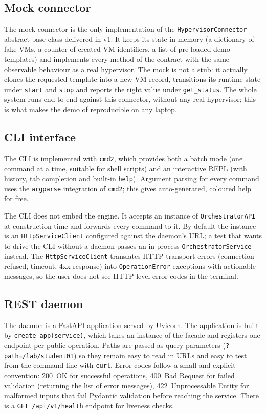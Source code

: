 \subsection{Mock connector}

The mock connector is the only implementation of the
\texttt{HypervisorConnector} abstract base class delivered in v1.
It keeps its state in memory (a dictionary of fake VMs, a counter
of created VM identifiers, a list of pre-loaded demo templates) and
implements every method of the contract with the same observable
behaviour as a real hypervisor. The mock is not a stub: it actually
clones the requested template into a new VM record, transitions
its runtime state under \texttt{start} and \texttt{stop} and reports
the right value under \texttt{get\_status}. The whole system runs
end-to-end against this connector, without any real hypervisor;
this is what makes the demo of  reproducible on any
laptop.

\subsection{CLI interface}

The CLI is implemented with \texttt{cmd2}, which provides both a
batch mode (one command at a time, suitable for shell scripts) and
an interactive REPL (with history, tab completion and built-in
\texttt{help}). Argument parsing for every command uses the
\texttt{argparse} integration of \texttt{cmd2}; this gives
auto-generated, coloured help for free.

The CLI does not embed the engine. It accepts an instance of
\texttt{OrchestratorAPI} at construction time and forwards every
command to it. By default the instance is an
\texttt{HttpServiceClient} configured against the daemon's URL; a
test that wants to drive the CLI without a daemon passes an
in-process \texttt{OrchestratorService} instead. The
\texttt{HttpServiceClient} translates HTTP transport errors
(connection refused, timeout, 4xx response) into
\texttt{OperationError} exceptions with actionable messages, so the
user does not see HTTP-level error codes in the terminal.

\subsection{REST daemon}

The daemon is a FastAPI application served by Uvicorn. The
application is built by \texttt{create\_app(service)}, which takes
an instance of the facade and registers one endpoint per public
operation. Paths are passed as query parameters
(\texttt{?path=/lab/student01}) so they remain easy to read in
URLs and easy to test from the command line with \texttt{curl}.
Error codes follow a small and explicit convention: 200~OK for
successful operations, 400~Bad Request for failed validation
(returning the list of error messages), 422~Unprocessable Entity for
malformed inputs that fail Pydantic validation before reaching the
service. There is a \texttt{GET /api/v1/health} endpoint for
liveness checks.

